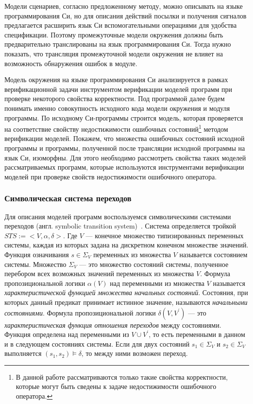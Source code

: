Модели сценариев, согласно предложенному методу, можно описывать на языке программирования Си, но для описания действий посылки и получения сигналов предлагается расширить язык Си вспомогательными операциями для удобства спецификации.
Поэтому промежуточные модели окружения должны быть предварительно транслированы на язык программирования Си. 
Тогда нужно показать, что трансляция промежуточной модели окружения не влияет на возможность обнаружения ошибок в модуле.

Модель окружения на языке программирования Си анализируется в рамках верификационной задачи инструментом верификации моделей программ при проверке некоторого свойства корректности.
Под программой далее будем понимать именно совокупность исходного кода модели окружения и модуля программы.
По исходному Си-программы строится модель, которая проверяется на соответствие свойству недостижимости ошибочных состояний\footnote{В данной работе рассматриваются только такие свойства корректности, которые могут быть сведены к задаче недостижимости ошибочного оператора.} методом верификации моделей.
Покажем, что множества ошибочных состояний исходной программы и программы, полученной после трансляции исходной программы на язык Си, изоморфны.
Для этого необходимо рассмотреть свойства таких моделей рассматриваемых программ, которые используются инструментами верификации моделей при проверке свойств недостижимости ошибочного оператора.

\subsubsection{Символическая система переходов}

Для описания моделей программ воспользуемся символическими системами переходов (англ. symbolic transition system)~\cite{Clarke:1981}.
Система определяется тройкой $STS \mathbf{:=} <V, \alpha, \delta>$. Где $V$ --- конечное множество типизированных переменных системы, каждая из которых задана на дискретном конечном множестве значений.
Функция означивания $s \in \Sigma_V$ переменных из множества $V$ называется состоянием системы. Множество $\Sigma_V$ --- это множество состояний системы, полученное перебором всех возможных значений переменных из множества $V$.
Формула пропозициональной логики $\alpha(V)$ над переменными из множества $V$ называется \textit{характеристической функцией множества начальных состояний}.
Состояния, при которых данный предикат принимает истинное значение, называются \textit{начальными состояниями}.
Формула пропозициональной логики $\delta(V, V^{'})$ --- это \textit{характеристическая функция отношения переходов} между состояниями.
Функция определена над переменными из $V \cup V^{'}$, то есть переменными в данном и в следующем состояниях системы.
Если для двух состояний $s_1 \in \Sigma_V$ и $s_2 \in \Sigma_V$ выполняется $(s_1, s_2) \models \delta$, то между ними возможен переход.

